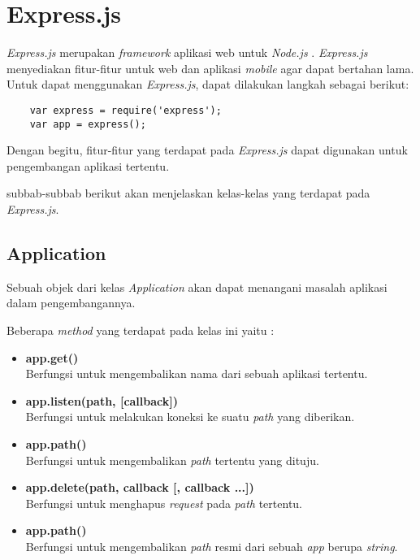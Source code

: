 


\section{Express.js}
\label{sec:Express.js}

\textit{Express.js} merupakan \textit{framework} aplikasi web untuk \textit{Node.js} \cite{expressjs}. \textit{Express.js} menyediakan fitur-fitur untuk web dan aplikasi \textit{mobile} agar dapat bertahan lama. Untuk dapat menggunakan \textit{Express.js}, dapat dilakukan langkah sebagai berikut: 
\begin{lstlisting}
	var express = require('express');
	var app = express();
\end{lstlisting}

Dengan begitu, fitur-fitur yang terdapat pada \textit{Express.js} dapat digunakan untuk pengembangan aplikasi tertentu.

subbab-subbab berikut akan menjelaskan kelas-kelas yang terdapat pada \textit{Express.js}.

\subsection{Application}
Sebuah objek dari kelas \textit{Application} akan dapat menangani masalah aplikasi dalam pengembangannya. 

Beberapa \textit{method} yang terdapat pada kelas ini yaitu : 
\begin{itemize}
	\item \textbf{app.get()} \\ Berfungsi untuk mengembalikan nama dari sebuah aplikasi tertentu.
	
	\item \textbf{app.listen(path, [callback])} \\ Berfungsi untuk melakukan koneksi ke suatu \textit{path} yang diberikan.
	
	\item \textbf{app.path()} \\ Berfungsi untuk mengembalikan \textit{path} tertentu yang dituju.
	
	\item \textbf{app.delete(path, callback [, callback ...])} \\ Berfungsi untuk menghapus \textit{request} pada \textit{path} tertentu.
	
	\item \textbf{app.path()} \\ Berfungsi untuk mengembalikan \textit{path} resmi dari sebuah \textit{app} berupa \textit{string}.
	
	
\end{itemize}

